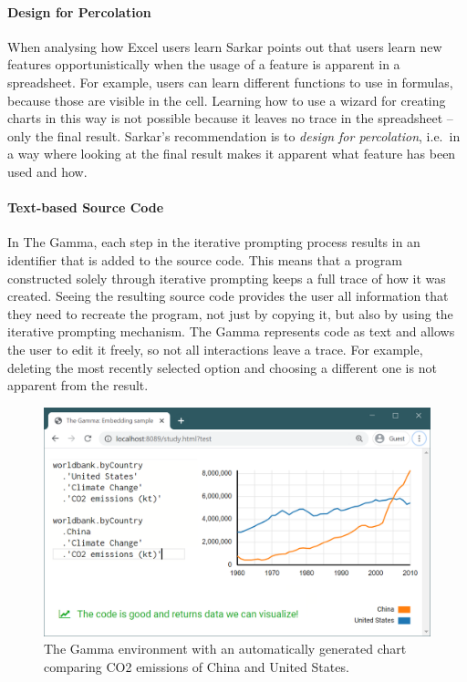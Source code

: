 \documentclass[manuscript,review,anonymous]{acmart}
\begin{document}
\paragraph{Design for Percolation}
When analysing how Excel users learn Sarkar \cite{learning} points out that users learn new
features opportunistically when the usage of a feature is apparent in a spreadsheet. For
example, users can learn different functions to use in formulas, because those are visible in
the cell. Learning how to use a wizard for creating charts in this way is not possible because
it leaves no trace in the spreadsheet -- only the final result. Sarkar's recommendation is to
\emph{design for percolation}, i.e.~in a way where looking at the final result makes it apparent
what feature has been used and how.

\paragraph{Text-based Source Code}
In The Gamma, each step in the iterative prompting process results in an identifier that is
added to the source code. This means that a program constructed solely through iterative prompting
keeps a full trace of how it was created. Seeing the resulting source code provides the user all
information that they need to recreate the program, not just by copying it, but also by using the
iterative prompting mechanism. The Gamma represents code as text and allows the user to edit it
freely, so not all interactions leave a trace. For example, deleting the most recently selected
option and choosing a different one is not apparent from the result.



\begin{figure}
\includegraphics[width=1\columnwidth]{figures/sidebyside}
\caption{The Gamma environment with an automatically generated chart comparing CO2 emissions
of China and United States.}
\label{fig:sidebyside}
\end{figure}
\end{document}
